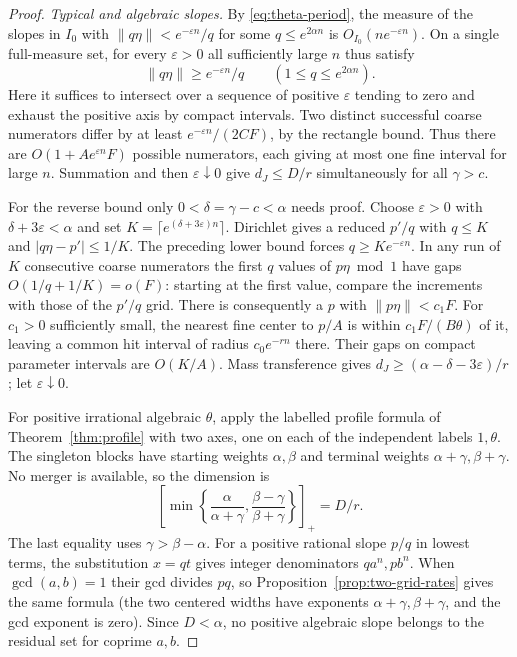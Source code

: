 \documentclass[11pt,reqno,a4paper]{amsart}
\theoremstyle{remark}
\numberwithin{equation}{section}
\begin{document}
\begin{proof}
\emph{Typical and algebraic slopes.}
By \eqref{eq:theta-period}, the measure of the slopes in \(I_0\) with
\(\|q\eta\|<e^{-\varepsilon n}/q\) for some \(q\le e^{2\alpha n}\)
is \(O_{I_0}(ne^{-\varepsilon n})\). On a single full-measure set,
for every \(\varepsilon>0\) all sufficiently large \(n\) thus satisfy
\[
             \|q\eta\|\ge e^{-\varepsilon n}/q
             \qquad(1\le q\le e^{2\alpha n}).
\]
Here it suffices to intersect over a sequence of positive
\(\varepsilon\) tending to zero and exhaust the positive axis by
compact intervals. Two distinct successful coarse numerators differ
by at least \(e^{-\varepsilon n}/(2CF)\), by the rectangle bound.
Thus there are \(O(1+Ae^{\varepsilon n}F)\) possible numerators,
each giving at most one fine interval for large \(n\). Summation
and then \(\varepsilon\downarrow0\) give \(d_J\le D/r\)
simultaneously for all \(\gamma>c\).

For the reverse bound only \(0<\delta=\gamma-c<\alpha\) needs proof.
Choose \(\varepsilon>0\) with \(\delta+3\varepsilon<\alpha\)
and set \(K=\lceil e^{(\delta+3\varepsilon)n}\rceil\).
Dirichlet gives a reduced \(p'/q\) with \(q\le K\) and
\(|q\eta-p'|\le 1/K\). The preceding lower bound forces
\(q\ge K e^{-\varepsilon n}\). In any run of \(K\) consecutive
coarse numerators the first \(q\) values of \(p\eta\bmod1\)
have gaps \(O(1/q+1/K)=o(F)\): starting at the first value,
compare the increments with those of the \(p'/q\) grid.
There is consequently a \(p\) with \(\|p\eta\|<c_1F\).
For \(c_1>0\) sufficiently small, the nearest fine center to \(p/A\)
is within \(c_1 F/(B\theta)\) of it, leaving a common hit interval
of radius \(c_0 e^{-rn}\) there. Their gaps on compact parameter
intervals are \(O(K/A)\). Mass transference gives
\(d_J\ge(\alpha-\delta-3\varepsilon)/r\); let \(\varepsilon\downarrow0\).

For positive irrational algebraic \(\theta\), apply the labelled
profile formula of Theorem~\ref{thm:profile} with two axes, one on
each of the independent labels \(1,\theta\). The singleton blocks
have starting weights \(\alpha,\beta\) and terminal weights
\(\alpha+\gamma,\beta+\gamma\). No merger is available, so the
dimension is
\[
 \left[\min\left\{\frac{\alpha}{\alpha+\gamma},
                  \frac{\beta-\gamma}{\beta+\gamma}\right\}\right]_+
     =D/r.
\]
The last equality uses \(\gamma>\beta-\alpha\). For a positive
rational slope \(p/q\) in lowest terms, the substitution \(x=qt\)
gives integer denominators \(qa^n,pb^n\). When \(\gcd(a,b)=1\)
their gcd divides \(pq\), so Proposition~\ref{prop:two-grid-rates}
gives the same formula (the two centered widths have exponents
\(\alpha+\gamma,\beta+\gamma\), and the gcd exponent is zero).
Since \(D<\alpha\), no positive algebraic slope belongs to the
residual set for coprime \(a,b\).
\end{proof}
\end{document}
